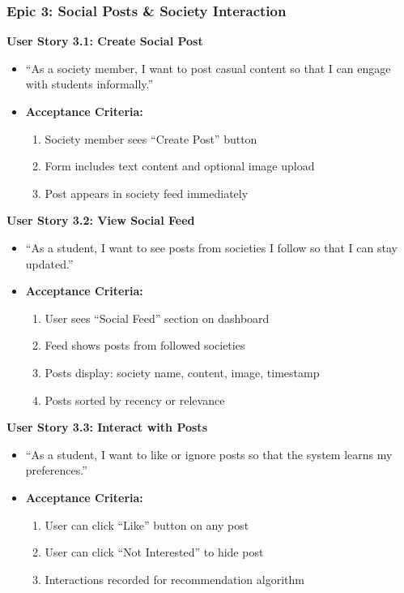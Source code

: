 \documentclass[12pt,a4paper]{article}
\begin{document}
\subsubsection{Epic 3: Social Posts \& Society Interaction}

\textbf{User Story 3.1: Create Social Post}
\begin{itemize}
    \item ``As a society member, I want to post casual content so that I can engage with students informally.''
    \item \textbf{Acceptance Criteria:}
    \begin{enumerate}
        \item Society member sees ``Create Post'' button
        \item Form includes text content and optional image upload
        \item Post appears in society feed immediately
    \end{enumerate}
\end{itemize}

\textbf{User Story 3.2: View Social Feed}
\begin{itemize}
    \item ``As a student, I want to see posts from societies I follow so that I can stay updated.''
    \item \textbf{Acceptance Criteria:}
    \begin{enumerate}
        \item User sees ``Social Feed'' section on dashboard
        \item Feed shows posts from followed societies
        \item Posts display: society name, content, image, timestamp
        \item Posts sorted by recency or relevance
    \end{enumerate}
\end{itemize}

\textbf{User Story 3.3: Interact with Posts}
\begin{itemize}
    \item ``As a student, I want to like or ignore posts so that the system learns my preferences.''
    \item \textbf{Acceptance Criteria:}
    \begin{enumerate}
        \item User can click ``Like'' button on any post
        \item User can click ``Not Interested'' to hide post
        \item Interactions recorded for recommendation algorithm
    \end{enumerate}
\end{itemize}
\end{document}
